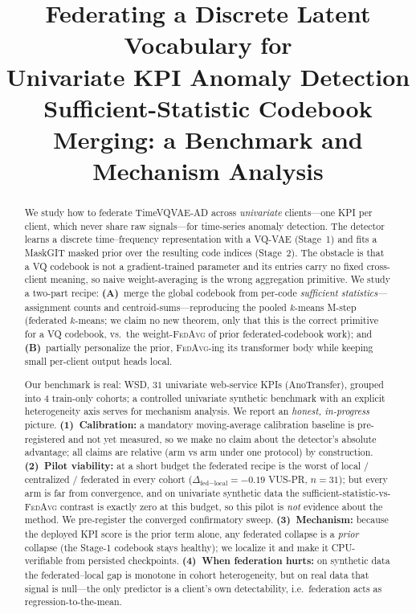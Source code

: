 \documentclass[11pt]{article}
\title{Federating a Discrete Latent Vocabulary for\\Univariate KPI Anomaly Detection\\
\large Sufficient-Statistic Codebook Merging: a Benchmark and Mechanism Analysis}
\author{}
\date{}
\theoremstyle{plain}
\theoremstyle{definition}
\begin{document}
\maketitle

\begin{abstract}
We study how to federate TimeVQVAE-AD across \emph{univariate} clients---one KPI per
client, which never share raw signals---for time-series anomaly detection. The detector
learns a discrete time--frequency representation with a VQ-VAE (Stage~1) and fits a
MaskGIT masked prior over the resulting code indices (Stage~2). The obstacle is that a VQ
codebook is not a gradient-trained parameter and its entries carry no fixed cross-client
meaning, so naive weight-averaging is the wrong aggregation primitive. We study a two-part
recipe: \textbf{(A)}~merge the global codebook from per-code \emph{sufficient
statistics}---assignment counts and centroid-sums---reproducing the pooled $k$-means
M-step (federated $k$-means; we claim no new theorem, only that this is the correct
primitive for a VQ codebook, vs.\ the weight-\textsc{FedAvg} of prior federated-codebook
work); and \textbf{(B)}~partially personalize the prior, \textsc{FedAvg}-ing its
transformer body while keeping small per-client output heads local.

Our benchmark is real: WSD, $31$ univariate web-service KPIs (AnoTransfer), grouped into
$4$ train-only cohorts; a controlled univariate synthetic benchmark with an explicit
heterogeneity axis serves for mechanism analysis. We report an \emph{honest, in-progress}
picture. \textbf{(1)~Calibration:} a mandatory moving-average calibration baseline is
pre-registered and not yet measured, so we make no claim about the detector's absolute
advantage; all claims are relative (arm vs arm under one protocol) by construction.
\textbf{(2)~Pilot viability:} at a short budget the federated recipe is
the worst of local / centralized / federated in every cohort ($\Delta_{\text{fed}-\text{local}}
={-}0.19$ VUS-PR, $n{=}31$); but every arm is far from convergence, and on univariate
synthetic data the sufficient-statistic-vs-\textsc{FedAvg} contrast is exactly zero at this
budget, so this pilot is \emph{not} evidence about the method. We pre-register the
converged confirmatory sweep. \textbf{(3)~Mechanism:} because the deployed KPI score is the
prior term alone, any federated collapse is a \emph{prior} collapse (the Stage-1 codebook
stays healthy); we localize it and make it CPU-verifiable from persisted checkpoints.
\textbf{(4)~When federation hurts:} on synthetic data the federated--local gap is monotone
in cohort heterogeneity, but on real data that signal is null---the only predictor is a
client's own detectability, i.e.\ federation acts as regression-to-the-mean.


\end{abstract}
\end{document}

